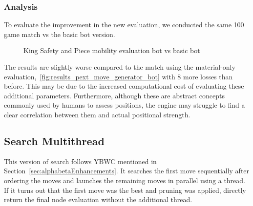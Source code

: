 \subsubsection{Analysis}

To evaluate the improvement in the new evaluation, we conducted the same 100 game match vs the basic bot version.

\vspace{1em}

\begin{center}
    \begin{figure}[H]
        \centering
        \caption{King Safety and Piece mobility evaluation bot vs basic bot}
        \label{fig:results_safety_mobility_bot}
    \end{figure}
\medskip
\end{center}

\noindent The results are slightly worse compared to the match using the material-only evaluation,~\ref{fig:results_pext_move_generator_bot} with 8 more losses than before. This may be due to the increased computational cost of evaluating these additional parameters. Furthermore, although these are abstract concepts commonly used by humans to assess positions, the engine may struggle to find a clear correlation between them and actual positional strength.

\subsection{Search Multithread}

This version of search follows YBWC mentioned in Section~\ref{sec:alphabetaEnhancements}. It searches the first move sequentially after ordering the moves and launches the remaining moves in parallel using a thread. If it turns out that the first move was the best and pruning was applied, directly return the final node evaluation without the additional thread.

